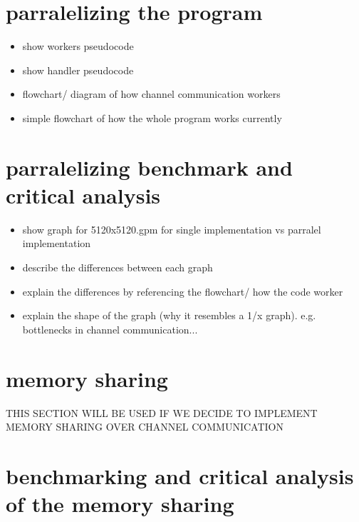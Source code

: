 \documentclass[twoside,twocolumn]{article}
\begin{document}
\section{parralelizing the program}

\begin{itemize}
  \item show workers pseudocode
  \item show handler pseudocode
  \item flowchart/ diagram of how channel communication workers
  \item simple flowchart of how the whole program works currently
\end{itemize}

\section{parralelizing benchmark and critical analysis}

\begin{itemize}
  \item show graph for 5120x5120.gpm for single implementation vs parralel implementation
  \item describe the differences between each graph
  \item explain the differences by referencing the flowchart/ how the code worker
  \item explain the shape of the graph (why it resembles a 1/x graph). e.g. bottlenecks in channel communication...
\end{itemize}

\section{memory sharing}

THIS SECTION WILL BE USED IF WE DECIDE TO IMPLEMENT MEMORY SHARING OVER CHANNEL COMMUNICATION

\section{benchmarking and critical analysis of the memory sharing}
\end{document}
